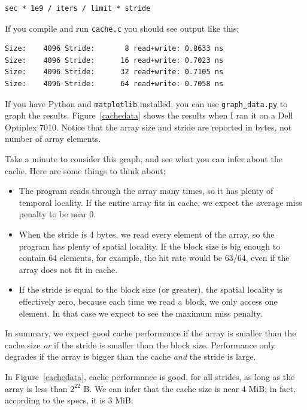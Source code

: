 \documentclass[12pt]{book}
\begin{document}
{\begin{verbatim}
sec * 1e9 / iters / limit * stride
\end{verbatim}

If you compile and run {\tt cache.c} you should see output like this:

\begin{verbatim}
Size:    4096 Stride:       8 read+write: 0.8633 ns
Size:    4096 Stride:      16 read+write: 0.7023 ns
Size:    4096 Stride:      32 read+write: 0.7105 ns
Size:    4096 Stride:      64 read+write: 0.7058 ns
\end{verbatim}

If you have Python and {\tt matplotlib} installed, you can use
\verb"graph_data.py" to graph the results.  Figure~\ref{cachedata}
shows the results when I ran it on a Dell Optiplex 7010.
Notice that the array size and stride are reported in
bytes, not number of array elements.

Take a minute to consider this graph, and see what you can infer
about the cache.  Here are some things to think about:

\begin{itemize}

\item The program reads through the array many times, so it has plenty
  of temporal locality.  If the entire array fits in cache, we expect
  the average miss penalty to be near 0.

\item When the stride is 4 bytes, we read every element of the array,
  so the program has plenty of spatial locality.  If the block size is
  big enough to contain 64 elements, for example, the hit rate would
  be 63/64, even if the array does not fit in cache.

\item If the stride is equal to the block size (or greater), the
  spatial locality is effectively zero, because each time we read a
  block, we only access one element.  In that case we expect to see
  the maximum miss penalty.

\end{itemize}

In summary, we expect good cache performance if the array is smaller
than the cache size {\em or} if the stride is smaller than the block
size.  Performance only degrades if the array is bigger than the
cache {\em and} the stride is large.

In Figure~\ref{cachedata}, cache performance is good, for all strides,
as long as the array is less than $2^{22}$ B.  We can infer that the
cache size is near 4 MiB; in fact, according to the specs, it is 3
MiB.

}
\end{document}
